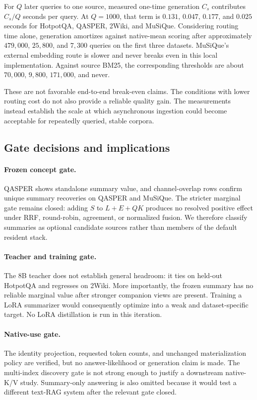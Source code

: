 \documentclass[11pt]{article}
\newcommand{\kv}{K/V\xspace}
\begin{document}
For $Q$ later queries to one source, measured one-time generation $C_s$ contributes $C_s/Q$ seconds per query. At $Q=1000$, that term is $0.131$, $0.047$, $0.177$, and $0.025$ seconds for HotpotQA, QASPER, 2Wiki, and MuSiQue. Considering routing time alone, generation amortizes against native-mean scoring after approximately $479{,}000$, $25{,}800$, and $7{,}300$ queries on the first three datasets. MuSiQue's external embedding route is slower and never breaks even in this local implementation. Against source BM25, the corresponding thresholds are about $70{,}000$, $9{,}800$, $171{,}000$, and never.

These are not favorable end-to-end break-even claims. The conditions with lower routing cost do not also provide a reliable quality gain. The measurements instead establish the scale at which asynchronous ingestion could become acceptable for repeatedly queried, stable corpora.

\subsection{Gate decisions and implications}

\paragraph{Frozen concept gate.}
QASPER shows standalone summary value, and channel-overlap rows confirm unique
summary recoveries on QASPER and MuSiQue. The stricter marginal gate remains
closed: adding $S$ to $L+E+QK$ produces no resolved positive effect under RRF,
round-robin, agreement, or normalized fusion. We therefore classify summaries
as optional candidate sources rather than members of the default resident
stack.

\paragraph{Teacher and training gate.}
The 8B teacher does not establish general headroom: it ties on held-out HotpotQA and regresses on 2Wiki. More importantly, the frozen summary has no reliable marginal value after stronger companion views are present. Training a LoRA summarizer would consequently optimize into a weak and dataset-specific target. No LoRA distillation is run in this iteration.

\paragraph{Native-use gate.}
The identity projection, requested token counts, and unchanged materialization policy are verified, but no answer-likelihood or generation claim is made. The multi-index discovery gate is not strong enough to justify a downstream native-\kv study. Summary-only answering is also omitted because it would test a different text-RAG system after the relevant gate closed.
\end{document}
